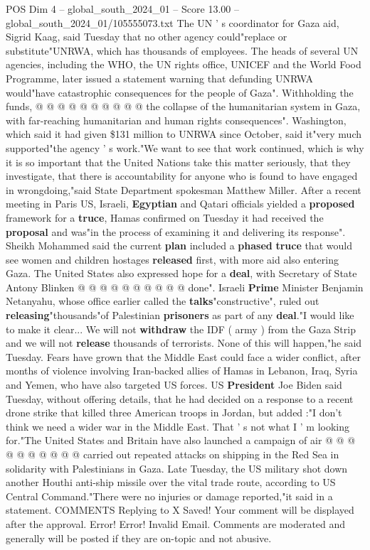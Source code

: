 \begin{textsample}{POS Dim 4 – global\_south\_2024\_01 – Score 13.00 – global\_south\_2024\_01/105555073.txt}
The UN ' s coordinator for Gaza aid, Sigrid Kaag, said Tuesday that no other agency could"replace or substitute"UNRWA, which has thousands of employees.
The heads of several UN agencies, including the WHO, the UN rights office, UNICEF and the World Food Programme, later issued a statement warning that defunding UNRWA would"have catastrophic consequences for the people of Gaza".
Withholding the funds, @ @ @ @ @ @ @ @ @ @ the collapse of the humanitarian system in Gaza, with far-reaching humanitarian and human rights consequences".
Washington, which said it had given \$131 million to UNRWA since October, said it"very much supported"the agency ' s work."We want to see that work continued, which is why it is so important that the United Nations take this matter seriously, that they investigate, that there is accountability for anyone who is found to have engaged in wrongdoing,"said State Department spokesman Matthew Miller.
After a recent meeting in Paris US, Israeli, \textbf{Egyptian} and Qatari officials yielded a \textbf{proposed} framework for a \textbf{truce}, Hamas confirmed on Tuesday it had received the \textbf{proposal} and was"in the process of examining it and delivering its response".
Sheikh Mohammed said the current \textbf{plan} included a \textbf{phased} \textbf{truce} that would see women and children hostages \textbf{released} first, with more aid also entering Gaza.
The United States also expressed hope for a \textbf{deal}, with Secretary of State Antony Blinken @ @ @ @ @ @ @ @ @ @ done".
Israeli \textbf{Prime} Minister Benjamin Netanyahu, whose office earlier called the \textbf{talks}"constructive", ruled out \textbf{releasing}"thousands"of Palestinian \textbf{prisoners} as part of any \textbf{deal}."I would like to make it clear...
We will not \textbf{withdraw} the IDF ( army ) from the Gaza Strip and we will not \textbf{release} thousands of terrorists.
None of this will happen,"he said Tuesday.
Fears have grown that the Middle East could face a wider conflict, after months of violence involving Iran-backed allies of Hamas in Lebanon, Iraq, Syria and Yemen, who have also targeted US forces.
US \textbf{President} Joe Biden said Tuesday, without offering details, that he had decided on a response to a recent drone strike that killed three American troops in Jordan, but added :"I don't think we need a wider war in the Middle East.
That ' s not what I ' m looking for."The United States and Britain have also launched a campaign of air @ @ @ @ @ @ @ @ @ @ carried out repeated attacks on shipping in the Red Sea in solidarity with Palestinians in Gaza.
Late Tuesday, the US military shot down another Houthi anti-ship missile over the vital trade route, according to US Central Command."There were no injuries or damage reported,"it said in a statement.
COMMENTS Replying to X Saved!
Your comment will be displayed after the approval.
Error!
Error!
Invalid Email.
Comments are moderated and generally will be posted if they are on-topic and not abusive.

\end{textsample}
